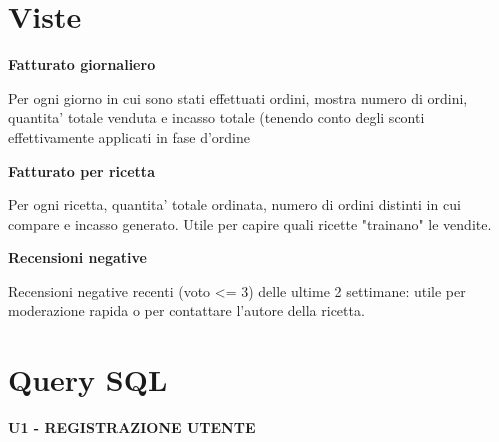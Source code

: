
\vspace{1em}

\section{Viste}

\vspace{1em}
\textbf{Fatturato giornaliero}

Per ogni giorno in cui sono stati effettuati ordini, mostra numero di ordini, quantita' totale venduta e incasso totale (tenendo conto degli sconti effettivamente applicati in fase d'ordine



\vspace{2em}
\textbf{Fatturato per ricetta}

Per ogni ricetta, quantita' totale ordinata, numero di ordini distinti in cui compare e incasso generato.
Utile per capire quali ricette "trainano" le vendite.



\vspace{2em}
\textbf{Recensioni negative}

Recensioni negative recenti (voto <= 3) delle ultime 2 settimane: utile per moderazione rapida o per contattare l'autore della ricetta.



\vspace{1em}

\section{Query SQL}

\vspace{1em}
\textbf{U1 - REGISTRAZIONE UTENTE}



